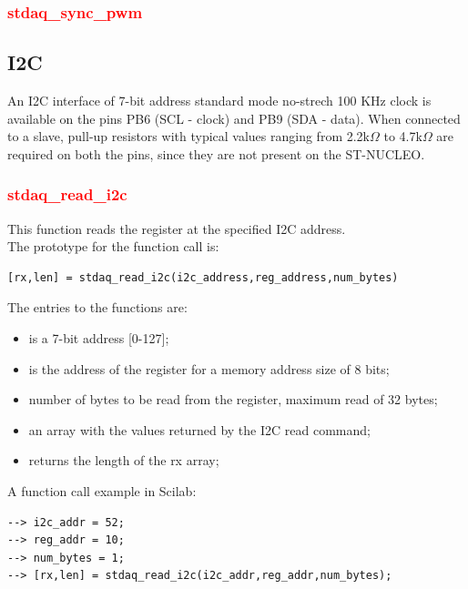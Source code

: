 \documentclass[letterpaper,10pt,english]{hitec}
\begin{document}
\subsubsection{\textcolor{red}{stdaq\_sync\_pwm}}

\subsection{I2C}

An I2C interface of 7-bit address standard mode no-strech 100 KHz clock is available on the pins PB6 (SCL - clock) and PB9 (SDA - data).
When connected to a slave, pull-up resistors with typical values ranging from 2.2k$\Omega$ to 4.7k$\Omega$ are required on both the pins, since they are not present on the ST-NUCLEO.

\subsubsection{\textcolor{red}{stdaq\_read\_i2c}}
This function reads the register at the specified I2C address. \\
The prototype for the function call is: 
\begin{verbatim}
[rx,len] = stdaq_read_i2c(i2c_address,reg_address,num_bytes)
\end{verbatim}
The entries to the functions are:
\begin{itemize}
\item [\textbf{[i2c\_address (IN)]}] is a 7-bit address [0-127];
\item [\textbf{[reg\_address (IN)]}] is the address of the register for a memory address size of 8 bits;
\item [\textbf{[num\_bytes (IN)]}] number of bytes to be read from the register, maximum read of 32 bytes;
\item [\textbf{[rx (OUT)]}] an array with the values returned by the I2C read command;
\item [\textbf{[len (OUT)]}] returns the length of the rx array;
\end{itemize}
A function call example in Scilab:
\begin{verbatim}
--> i2c_addr = 52;
--> reg_addr = 10;
--> num_bytes = 1;
--> [rx,len] = stdaq_read_i2c(i2c_addr,reg_addr,num_bytes);
\end{verbatim}
\end{document}
